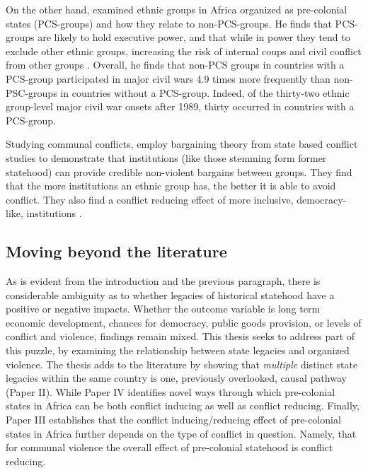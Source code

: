 On the other hand, \citet{Paine2019} examined ethnic groups in Africa organized
as pre-colonial states (PCS-groups) and how they relate to non-PCS-groups. He finds
that PCS-groups are likely to hold executive power, and that while in power they tend to
exclude other ethnic groups, increasing the risk of internal coups and civil
conflict from other groups \citep{Paine2019}. Overall, he finds that non-PCS
groups in countries with a PCS-group participated in major civil wars 4.9 times
more frequently than non-PSC-groups in countries without a PCS-group. Indeed, of
the thirty-two ethnic group-level major civil war onsets after 1989, thirty
occurred in countries with a PCS-group.

Studying communal conflicts, \citet{Wig2018} employ bargaining theory from state
based conflict studies to demonstrate that institutions (like those stemming form
former statehood) can provide credible non-violent bargains between groups. They
find that the more institutions an ethnic group has, the better it is able to
avoid conflict. They also find a conflict reducing effect of more inclusive,
democracy-like, institutions \citep{Wig2018}.

\subsection{Moving beyond the literature} \label{Moving beyond}


As is evident from the introduction and the previous paragraph, there is
considerable ambiguity as to whether legacies of historical statehood have a
positive or negative impacts. Whether the outcome variable is long term economic
development, chances for democracy, public goods provision, or levels of
conflict and violence, findings remain mixed. This thesis seeks to address part
of this puzzle, by examining the relationship between state legacies and
organized violence. The thesis adds to the literature by showing that
\textit{multiple} distinct state legacies within the same country is one,
previously overlooked, causal pathway (Paper II). While Paper IV
identifies novel ways through which pre-colonial states in Africa can be both
conflict inducing as well as conflict reducing. Finally, Paper III
establishes that the conflict inducing/reducing effect of pre-colonial states in
Africa further depends on the type of conflict in question. Namely, that for
communal violence the overall effect of pre-colonial statehood is conflict
reducing.

